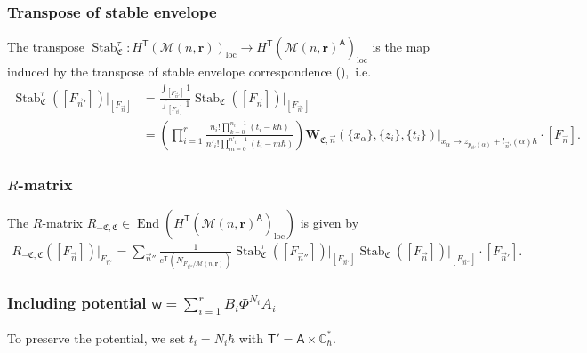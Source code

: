 \documentclass[10pt]{amsart}
\theoremstyle{definition}
\numberwithin{equation}{section}
\newcommand{\bC}{\mathbb{C}}
\newcommand{\cM}{\mathcal{M}}
\newcommand{\fC}{\mathfrak{C}}
\newcommand{\loc}{\mathrm{loc}}
\newcommand{\sA}{\mathsf{A}}
\newcommand{\sT}{\mathsf{T}}
\newcommand{\sw}{\mathsf{w}}
\newcommand{\End}{\operatorname{End}}
\newcommand{\Stab}{\operatorname{Stab}}
\begin{document}
\subsubsection{Transpose of stable envelope}
The transpose $\Stab_\fC^{\tau}\colon H^\sT(\cM(n,\mathbf r))_\loc\to H^\sT(\cM(n,\mathbf r)^\sA)_\loc$ is the map induced by the transpose of stable envelope correspondence (\cite[\S 3.4.2]{COZZ}),~i.e.
\begin{align*}
    \Stab_\fC^{\tau}([F_{\vec{n}'}])\bigg|_{[F_{\vec{n}}]}&=\frac{\int_{[F_{\vec{n}'}]}1}{\int_{[F_{\vec{n}}]}1} \Stab_\fC([F_{\vec{n}}])\bigg|_{[F_{\vec{n}'}]}\\
    &=\left(\prod_{i=1}^r \frac{n_i!\prod_{k=0}^{n_i-1}(t_i-k\hbar)}{n'_i!\prod_{m=0}^{n'_i-1}(t_i-m\hbar)}\right)\mathbf W_{\fC,\vec{n}}(\{x_\alpha\},\{z_i\},\{t_i\})\bigg|_{x_\alpha\mapsto z_{p_{\vec{n}'}(\alpha)}+l_{\vec{n}'}(\alpha)\hbar}\cdot[F_{\vec{n}}].
\end{align*}

\subsubsection{$R$-matrix}

The $R$-matrix $R_{-\fC,\fC}\in \End(H^\sT(\cM(n,\mathbf r)^\sA)_\loc)$ is given by
\begin{align*}
    R_{-\fC,\fC}([F_{\vec{n}}])\bigg|_{F_{\vec{n}'}}=\sum_{\vec{n}''}\frac{1}{e^\sT(N_{F_{\vec{n}''}/\cM(n,\mathbf r)})} \Stab_\fC^{\tau}([F_{\vec{n}''}])\bigg|_{[F_{\vec{n}'}]} \Stab_\fC([F_{\vec{n}}])\bigg|_{[F_{\vec{n}''}]}\cdot[F_{\vec{n}'}].
\end{align*}

\subsubsection{Including potential \texorpdfstring{$\sw=\sum_{i=1}^rB_i\Phi^{N_i}A_i$}{for higher spin modules}}\label{sec higher spin R-matrix} 
To preserve the potential, we set $t_i=N_i\hbar$ with $\sT'=\sA\times \bC^*_\hbar$. 
\end{document}
